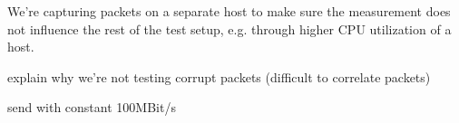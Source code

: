 We're capturing packets on a separate host to make sure the measurement does not influence the rest of the test setup, e.g. through higher CPU utilization of a host.





explain why we're not testing corrupt packets (difficult to correlate packets)

send with constant 100MBit/s

\cite{RFC7858}
